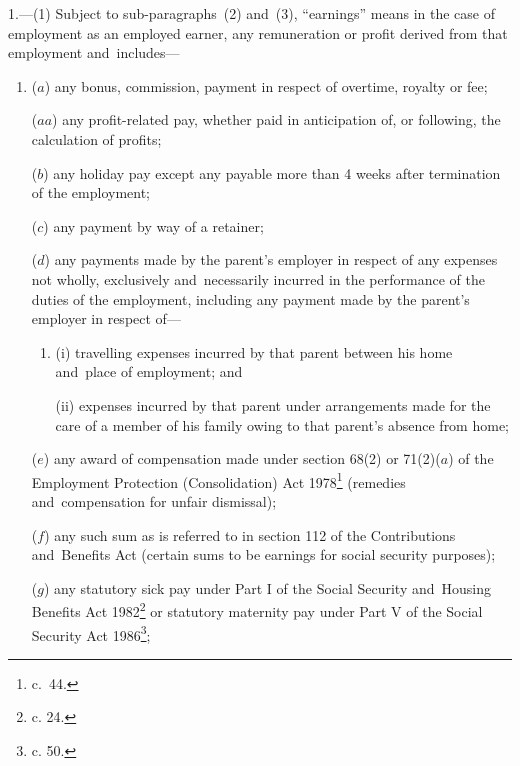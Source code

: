 \documentclass[12pt,a4paper]{article}
\begin{document}
\renewcommand\parthead{--- Schedule 1 Part I Chapter I}

1.—(1) Subject to sub-paragraphs~(2) and~(3), “earnings” means in the case of employment as an employed earner, any remuneration or profit derived from that employment and~includes—
\begin{enumerate}\item[]
($a$) any bonus, commission, 
payment in respect of overtime,  %
royalty or fee;

($aa$) any profit-related pay, whether paid in anticipation of, or following, the calculation of profits;

($b$) any holiday pay except any payable more than 4 weeks after termination of the employment;

($c$) any payment by way of a retainer;


($d$) any payments made by the parent’s employer in respect of any expenses not wholly, exclusively and~necessarily incurred in the performance of the duties of the employment, including any payment made by the parent’s employer in respect of—
\begin{enumerate}\item[]
(i) travelling expenses incurred by that parent between his home and~place of employment; and

(ii) expenses incurred by that parent under arrangements made for the care of a member of his family owing to that parent’s absence from home;
\end{enumerate}

($e$) any award of compensation made under section 68(2) or 71(2)($a$) of the Employment Protection (Consolidation) Act 1978\footnote{ c.~44.} (remedies and~compensation for unfair dismissal);

($f$) any such sum as is referred to in section 112 of the Contributions and~Benefits Act (certain sums to be earnings for social security purposes);

($g$) any statutory sick pay under Part I of the Social Security and~Housing Benefits Act 1982\footnote{ c. 24.} or statutory maternity pay under Part V of the Social Security Act 1986\footnote{ c. 50.};


\end{enumerate}
\end{document}
